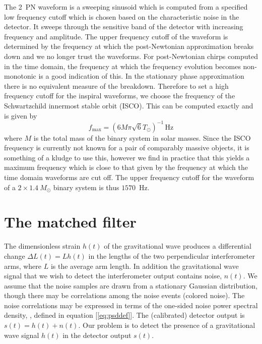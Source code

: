 The 2~PN waveform is a sweeping sinusoid which is computed from a specified 
low frequency cutoff which is chosen based on the characteristic noise in the
detector. It sweeps through the sensitive band of the detector with increasing
frequency and amplitude.  The upper frequency cutoff of the waveform is
determined by the frequency at which the post-Newtonian approximation breaks
down and we no longer trust the waveforms. For post-Newtonian chirps computed
in the time domain, the frequency at which the frequency evolution becomes
non-monotonic is a good indication of this.  In the stationary phase
approximation there is no equivalent measure of the breakdown.  Therefore to
set a high frequency cutoff for the inspiral waveforms, we choose the
frequency of the Schwartzchild innermost stable orbit (ISCO). This can be
computed exactly and is given by
\begin{equation}
f_{\mathrm{max}} = \left( 6M\pi\sqrt{6}T_\odot \right)^{-1}\,\mathrm{Hz}
\label{eq:isco}
\end{equation} where $M$ is the total mass of the binary system in solar
masses. Since the ISCO frequency is currently not known for a pair of
comparably massive objects, it is something of a kludge to use this, however
we find in practice that this yields a maximum frequency which is close to that
given by the frequency at which the time domain waveforms are cut off.  The
upper frequency cutoff for the waveform of a $2\times 1.4 \> M_\odot$ binary
system is thus $1570$~Hz.

\section{The matched filter}
\label{s:matchedfilter}

The dimensionless strain $h(t)$ of the gravitational wave produces a
differential change $\Delta L(t)=L h(t)$ in the lengths of the two
perpendicular interferometer arms, where $L$ is the average arm length.  In
addition the gravitational wave signal that we wish to detect the
interferometer output contains noise, $n(t)$. We assume that the noise samples
are drawn from a stationary Gaussian distribution, though there may be
correlations among the noise events (colored noise). The noise correlations
may be expressed in terms of the one-sided noise power spectral density,
\ospsd, defined in equation [\ref{eq:psddef}]. The (calibrated) detector
output is $s(t) = h(t) + n(t)$.  Our problem is to detect the presence of a
gravitational wave signal $h(t)$ in the detector output $s(t)$.


